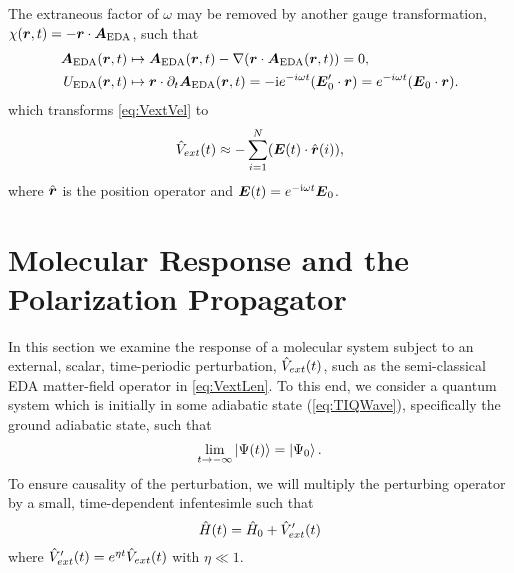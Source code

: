 The extraneous factor of $\omega$ may be removed by another gauge transformation, $\chi(\boldsymbol{r},t) = -\boldsymbol{r} \cdot \boldsymbol{A}_\mathrm{EDA}$,
such that
\begin{align}
  \boldsymbol{A}_\mathrm{EDA}(\boldsymbol{r}, t) &\mapsto \boldsymbol{A}_\mathrm{EDA}(\boldsymbol{r}, t) - \nabla (\boldsymbol{r} \cdot \boldsymbol{A}_\mathrm{EDA}(\boldsymbol{r},t))  = 0, \\
  U_\mathrm{EDA}(\boldsymbol{r},t)  &\mapsto \boldsymbol{r} \cdot \partial_t \boldsymbol{A}_\mathrm{EDA}(\boldsymbol{r},t) = -\mathrm i e^{-i \omega t} (\boldsymbol{E}'_0 \cdot \boldsymbol{r}) =  e^{-i \omega t}(\boldsymbol{E}_0 \cdot \boldsymbol{r}).
\end{align}
which transforms \cref{eq:VextVel} to
\begin{equation}
\label{eq:VextLen}
\hat{V}_{ext}(t) \approx -\sum_{i=1}^N ( \boldsymbol{E}(t) \cdot \hat{\boldsymbol{r}}(i) ),
\end{equation}
where $\hat{\boldsymbol{r}}$ is the position operator and $\boldsymbol{E}(t) = e^{-\mathrm i\omega t}\boldsymbol{E}_0$.

\section{Molecular Response and the Polarization Propagator}
\label{sec:PolarProp}

In this section we examine the response of a molecular system subject to an external, scalar, time-periodic perturbation, 
$\hat{V}_{ext}(t)$, such as the semi-classical EDA matter-field operator in \cref{eq:VextLen}. 
To this end, we consider a
quantum system which is initially in some adiabatic state (\cref{eq:TIQWave}), specifically the ground adiabatic state,
such that
\begin{equation}
\lim_{t \rightarrow -\infty} \left\vert \Psi (t) \right\rangle = \left\vert \Psi_0 \right\rangle.
\end{equation}
To ensure causality of the perturbation, we will multiply the perturbing operator by a small, time-dependent infentesimle
 such that
\begin{equation}
\hat{H}(t) = \hat{H}_0 + \hat{V}'_{ext}(t)
\end{equation}
where $\hat{V}'_{ext}(t) = e^{\eta t } \hat{V}_{ext}(t)$ with $\eta \ll 1$.

